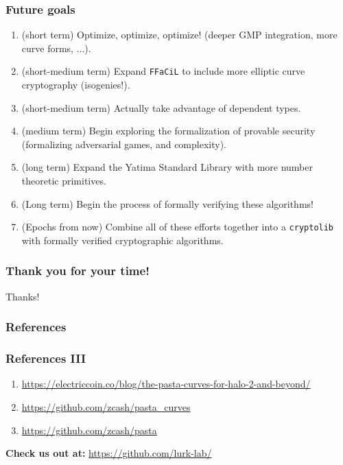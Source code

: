 \documentclass[options]{beamer}
\begin{document}
\begin{frame}[fragile]
    \frametitle{Future goals}

    \begin{enumerate}
        \item (short term) Optimize, optimize, optimize! (deeper GMP integration, more curve forms, ...).
        \item (short-medium term) Expand \verb+FFaCiL+ to include more elliptic curve cryptography (isogenies!).
        \item (short-medium term) Actually take advantage of dependent types.
        \item (medium term) Begin exploring the formalization of provable security (formalizing adversarial games, and complexity).
        \item (long term) Expand the Yatima Standard Library with more number theoretic primitives.
        \item (Long term) Begin the process of formally verifying these algorithms!
        \item (Epochs from now) Combine all of these efforts together into a \verb+cryptolib+ with formally verified cryptographic algorithms.
    \end{enumerate}

\end{frame}

\begin{frame}
    \frametitle{Thank you for your time!}
    \begin{center}
    Thanks!
    \end{center}
\end{frame}

\begin{frame}[allowframebreaks]
    \frametitle{References}
    \nocite{BERGERON1989403}
    \nocite{cryptoeprint:2023/369}
    \nocite{cryptoeprint:2012/549}
    \nocite{10.1007/3-540-44647-8_11}
    \nocite{cohen2005handbook}
    \nocite{joyofcryptography}
    \nocite{Bernstein2002PippengersEA}
    \printbibliography

\end{frame}

\begin{frame}
    \frametitle{References III}

    \begin{enumerate}
        \item \url{https://electriccoin.co/blog/the-pasta-curves-for-halo-2-and-beyond/}
        \item \url{https://github.com/zcash/pasta_curves}
        \item \url{https://github.com/zcash/pasta}
    \end{enumerate}

    \vspace{30pt}

    {\bf Check us out at:}
    \url{https://github.com/lurk-lab/}
\end{frame}
\end{document}
